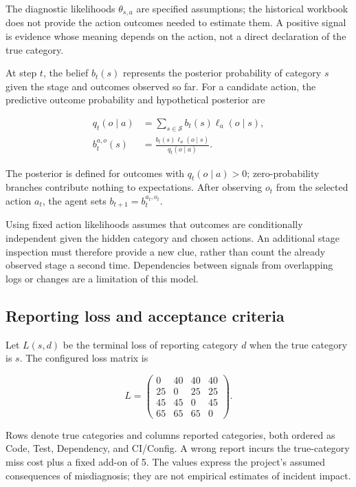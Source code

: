 \documentclass{article}
\begin{document}
The diagnostic likelihoods $\theta_{s,a}$ are specified assumptions;
the historical workbook does not provide the action outcomes needed to
estimate them. A positive signal is evidence whose meaning depends on the
action, not a direct declaration of the true category.

At step $t$, the belief $b_t(s)$ represents the posterior probability of
category $s$ given the stage and outcomes observed so far. For a candidate
action, the predictive outcome probability and hypothetical posterior are

\begin{align}
q_t(o\mid a)
&=\sum_{s\in\mathcal{S}}b_t(s)\ell_a(o\mid s),
\label{eq:agent_predictive_outcome}\\
b_t^{a,o}(s)
&=\frac{b_t(s)\ell_a(o\mid s)}{q_t(o\mid a)}.
\label{eq:agent_posterior}
\end{align}

The posterior is defined for outcomes with $q_t(o\mid a)>0$; zero-probability
branches contribute nothing to expectations. After observing $o_t$ from
the selected action $a_t$, the agent sets $b_{t+1}=b_t^{a_t,o_t}$.

Using fixed action likelihoods assumes that outcomes are conditionally
independent given the hidden category and chosen actions. An additional
stage inspection must therefore provide a new clue, rather than count the
already observed stage a second time. Dependencies between signals from
overlapping logs or changes are a limitation of this model.

\subsection{Reporting loss and acceptance criteria}

Let $L(s,d)$ be the terminal loss of reporting category $d$ when the true
category is $s$. The configured loss matrix is

\begin{equation}
L=
\begin{pmatrix}
0 & 40 & 40 & 40\\
25 & 0 & 25 & 25\\
45 & 45 & 0 & 45\\
65 & 65 & 65 & 0
\end{pmatrix}.
\label{eq:agent_loss_matrix}
\end{equation}

Rows denote true categories and columns reported categories, both ordered
as Code, Test, Dependency, and CI/Config. A wrong report incurs the
true-category miss cost plus a fixed add-on of 5. The values express the
project's assumed consequences of misdiagnosis; they are not empirical
estimates of incident impact.
\end{document}
